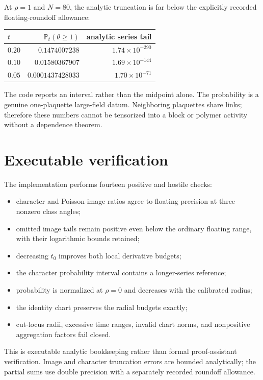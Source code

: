 \documentclass[11pt]{article}
\theoremstyle{definition}
\begin{document}
At $\rho=1$ and $N=80$, the analytic truncation is far below the explicitly
recorded floating-roundoff allowance:
\begin{center}
\begin{tabular}{@{}lrr@{}}
\toprule
$t$ & $\mathbb P_t(\theta\ge1)$ & analytic series tail\\
\midrule
$0.20$ & $0.1474007238$ & $1.74\times10^{-290}$\\
$0.10$ & $0.01580367907$ & $1.69\times10^{-144}$\\
$0.05$ & $0.0001437428033$ & $1.70\times10^{-71}$\\
\bottomrule
\end{tabular}
\end{center}
The code reports an interval rather than the midpoint alone.  The probability
is a genuine one-plaquette large-field datum.  Neighboring plaquettes share
links; therefore these numbers cannot be tensorized into a block or polymer
activity without a dependence theorem.

\section{Executable verification}

The implementation performs fourteen positive and hostile checks:
\begin{itemize}
\item character and Poisson-image ratios agree to floating precision at three
nonzero class angles;
\item omitted image tails remain positive even below the ordinary floating
range, with their logarithmic bounds retained;
\item decreasing $t_0$ improves both local derivative budgets;
\item the character probability interval contains a longer-series reference;
\item probability is normalized at $\rho=0$ and decreases with the calibrated
radius;
\item the identity chart preserves the radial budgets exactly;
\item cut-locus radii, excessive time ranges, invalid chart norms, and
nonpositive aggregation factors fail closed.
\end{itemize}

This is executable analytic bookkeeping rather than formal proof-assistant
verification.  Image and character truncation errors are bounded analytically;
the partial sums use double precision with a separately recorded roundoff
allowance.
\end{document}
